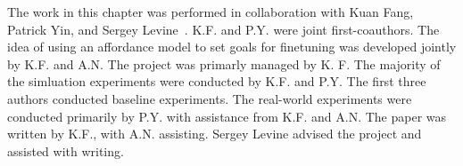 The work in this chapter was performed in collaboration with Kuan Fang, Patrick Yin, and Sergey Levine~\citep{pong2019skewfit}. K.F. and P.Y. were joint first-coauthors. The idea of using an affordance model to set goals for finetuning was developed jointly by K.F. and A.N. The project was primarly managed by K. F. The majority of the simluation experiments were conducted by K.F. and P.Y. The first three authors conducted baseline experiments. The real-world experiments were conducted primarily by P.Y. with assistance from K.F. and A.N. The paper was written by K.F., with A.N. assisting. Sergey Levine advised the project and assisted with writing.


% 
% 


% 
